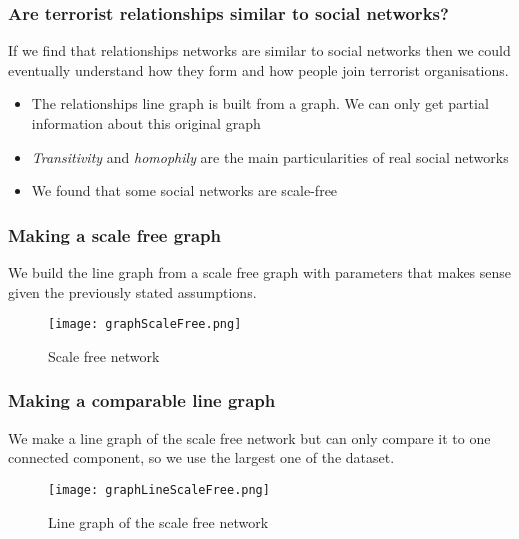 \begin{frame}
\frametitle{Are terrorist relationships similar to social networks?}
If we find that relationships networks are similar to social networks then we could eventually understand how they form and how people join terrorist organisations.

\begin{itemize}
\item The relationships line graph is built from a graph. We can only get partial information about this original graph
\item \emph{Transitivity} and \emph{homophily} are the main particularities of real social networks
\item We found that some social networks are scale-free
\end{itemize}

\end{frame}


\begin{frame}
\frametitle{Making a scale free graph}

We build the line graph from a scale free graph with parameters that makes sense given the previously stated assumptions.

\begin{figure}[H]
\begin{center}
        \texttt{[image: graphScaleFree.png]}
        \caption{Scale free network}
        \label{fig:Scalefree}
        \end{center}
\end{figure}
\end{frame}
    

\begin{frame}
\frametitle{Making a comparable line graph}
We make a line graph of the scale free network but can only compare it to one connected component, so we use the largest one of the dataset.

\begin{figure}[H]
\begin{center}
    \texttt{[image: graphLineScaleFree.png]}
    \caption{Line graph of the scale free network}
    \label{fig:lineG}
\end{center}
\end{figure}
\end{frame}

